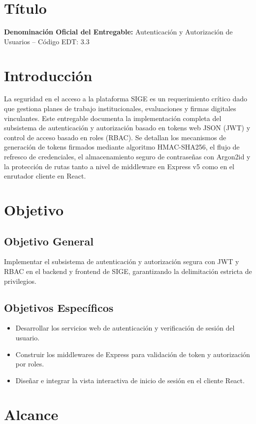 \documentclass[12pt,a4paper]{article}
\begin{document}
\section{Título}
\textbf{Denominación Oficial del Entregable:} Autenticación y Autorización de Usuarios -- Código EDT: 3.3

\section{Introducción}
La seguridad en el acceso a la plataforma SIGE es un requerimiento crítico dado que gestiona planes de trabajo institucionales, evaluaciones y firmas digitales vinculantes. Este entregable documenta la implementación completa del subsistema de autenticación y autorización basado en tokens web JSON (JWT) y control de acceso basado en roles (RBAC). Se detallan los mecanismos de generación de tokens firmados mediante algoritmo HMAC-SHA256, el flujo de refresco de credenciales, el almacenamiento seguro de contraseñas con Argon2id y la protección de rutas tanto a nivel de middleware en Express v5 como en el enrutador cliente en React.

\section{Objetivo}
\subsection{Objetivo General}
Implementar el subsistema de autenticación y autorización segura con JWT y RBAC en el backend y frontend de SIGE, garantizando la delimitación estricta de privilegios.
\subsection{Objetivos Específicos}
\begin{itemize}[leftmargin=1.5em, itemsep=2pt]
    \item Desarrollar los servicios web de autenticación y verificación de sesión del usuario.
    \item Construir los middlewares de Express para validación de token y autorización por roles.
    \item Diseñar e integrar la vista interactiva de inicio de sesión en el cliente React.
\end{itemize}

\section{Alcance}
\end{document}
